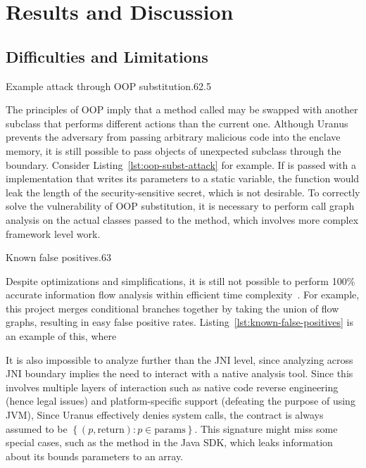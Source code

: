 \section{Results and Discussion}\label{sec:results-and-discussion}

\subsection{Difficulties and Limitations}\label{subsec:difficulties-and-limitations}
{Example attack through OOP substitution}{.6}{2.5}

The principles of \ac{OOP} imply that a method called may be swapped with another subclass
that performs different actions than the current one.
Although Uranus prevents the adversary
from passing arbitrary malicious code into the enclave memory,
it is still possible to pass objects of unexpected subclass
through the  boundary.
Consider Listing~\ref{lst:oop-subst-attack} for example.
If  is passed with a  implementation
that writes its parameters to a static variable,
the function would leak the length of the security-sensitive secret,
which is not desirable.
To correctly solve the vulnerability of \ac{OOP} substitution,
it is necessary to perform call graph analysis on the actual classes passed to the method,
which involves more complex framework level work.

{Known false positives}{.6}{3}

Despite optimizations and simplifications,
it is still not possible to perform 100\% accurate information flow analysis
within efficient time complexity~\cite{SmithGeoffrey2007PoSI}.
For example, this project merges conditional branches together
by taking the union of flow graphs,
resulting in easy false positive rates.
Listing~\ref{lst:known-false-positives} is an example of this,
where 

It is also impossible to analyze further than the \ac{JNI} level,
since analyzing across \ac{JNI} boundary implies
the need to interact with a native analysis tool.
Since this involves multiple layers of interaction
such as native code reverse engineering (hence legal issues)
and platform-specific support (defeating the purpose of using \ac{JVM}),
Since Uranus effectively denies system calls,
the contract is always assumed to be
$\left\{ (p, \text{return}) : p \in \text{params} \right\}$.
This signature might miss some special cases,
such as the  method in the Java \ac{SDK},
which leaks information about its bounds parameters to an array.

